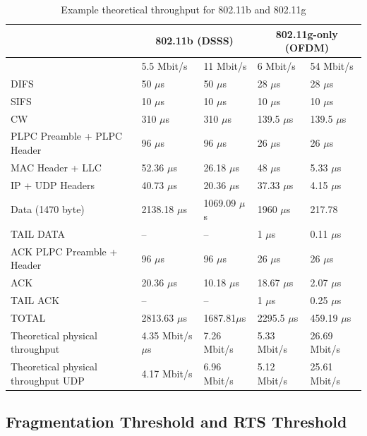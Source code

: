 	\begin{table}[h!]
		\begin{tabularx}{15cm}{ | X | X | X | X | X | }
			\hline
				 & \multicolumn{2}{|c|}{ 802.11b (DSSS)} & \multicolumn{2}{|c|}{ 802.11g-only (OFDM)} \\
				 \hline
				 & 5.5 Mbit/s & 11 Mbit/s & 6 Mbit/s & 54 Mbit/s \\
			\hline
				DIFS & 50 $\mu$s & 50 $\mu$s & 28 $\mu$s & 28 $\mu$s \\
			\hline
				SIFS & 10 $\mu$s & 10 $\mu$s & 10 $\mu$s & 10 $\mu$s \\
			\hline
				CW & 310 $\mu$s & 310 $\mu$s & 139.5 $\mu$s & 139.5 $\mu$s \\
			\hline
				PLPC Preamble + PLPC Header & 96 $\mu$s & 96 $\mu$s & 26 $\mu$s & 26 $\mu$s \\
			\hline
				MAC Header + LLC & 52.36 $\mu$s & 26.18 $\mu$s & 48 $\mu$s & 5.33 $\mu$s \\
			\hline
				IP + UDP Headers & 40.73 $\mu$s & 20.36 $\mu$s & 37.33 $\mu$s & 4.15 $\mu$s \\
			\hline
				Data (1470 byte)& 2138.18 $\mu$s & 1069.09 $\mu$s & 1960 $\mu$s & 217.78 \\
			\hline
				TAIL DATA & -- & -- & 1 $\mu$s & 0.11 $\mu$s \\
			\hline
				ACK PLPC Preamble + Header & 96 $\mu$s & 96 $\mu$s & 26 $\mu$s & 26 $\mu$s \\
			\hline
				ACK & 20.36 $\mu$s & 10.18 $\mu$s & 18.67 $\mu$s & 2.07 $\mu$s \\
			\hline
				TAIL ACK & -- & -- & 1 $\mu$s & 0.25 $\mu$s \\
			\hline
			\hline
				TOTAL & 2813.63 $\mu$s & 1687.81$\mu$s & 2295.5 $\mu$s & 459.19 $\mu$s \\
			\hline
			\hline
				Theoretical physical throughput & 4.35 Mbit/s $\mu$s & 7.26 Mbit/s & 5.33 Mbit/s & 26.69 Mbit/s \\
			\hline
			\hline
				Theoretical physical throughput UDP & 4.17 Mbit/s & 6.96 Mbit/s & 5.12 Mbit/s & 25.61 Mbit/s \\
			\hline
			
		\end{tabularx}
		\caption{Example theoretical throughput for 802.11b and 802.11g}
		\label{tbl:80211bgexample}
	\end{table}
	
	
	\subsection{Fragmentation Threshold and RTS Threshold} \label{theory:frag_rts}
	
